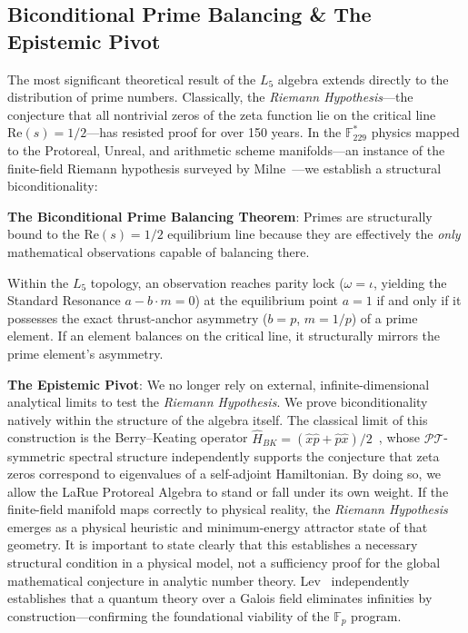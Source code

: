 \subsection{Biconditional Prime Balancing \& The Epistemic Pivot}

The most significant theoretical result of the $L_5$ algebra extends directly to the distribution of prime numbers. Classically, the \emph{Riemann Hypothesis}---the conjecture that all nontrivial zeros of the zeta function lie on the critical line $\text{Re}(s) = 1/2$---has resisted proof for over 150 years. In the $\mathbb{F}_{229}^*$ physics mapped to the Protoreal, Unreal, and arithmetic scheme manifolds---an instance of the finite-field Riemann hypothesis surveyed by Milne~\cite{Milne2015}---we establish a structural biconditionality:

\textbf{The Biconditional Prime Balancing Theorem}: Primes are structurally bound to the $\text{Re}(s) = 1/2$ equilibrium line because they are effectively the \emph{only} mathematical observations capable of balancing there. 

Within the $L_5$ topology, an observation reaches parity lock ($\omega = \iota$, yielding the Standard Resonance $a - b \cdot m = 0$) at the equilibrium point $a = 1$ if and only if it possesses the exact thrust-anchor asymmetry ($b = p$, $m = 1/p$) of a prime element. If an element balances on the critical line, it structurally mirrors the prime element's asymmetry.

\textbf{The Epistemic Pivot}: We no longer rely on external, infinite-dimensional analytical limits to test the \emph{Riemann Hypothesis}. We prove biconditionality natively within the structure of the algebra itself. The classical limit of this construction is the Berry--Keating operator $\hat{H}_{BK} = (\hat{x}\hat{p} + \hat{p}\hat{x})/2$~\cite{BenderBrodyMuller2017}, whose $\mathcal{PT}$-symmetric spectral structure independently supports the conjecture that zeta zeros correspond to eigenvalues of a self-adjoint Hamiltonian. By doing so, we allow the LaRue Protoreal Algebra to stand or fall under its own weight. If the finite-field manifold maps correctly to physical reality, the \emph{Riemann Hypothesis} emerges as a physical heuristic and minimum-energy attractor state of that geometry. It is important to state clearly that this establishes a necessary structural condition in a physical model, not a sufficiency proof for the global mathematical conjecture in analytic number theory. Lev~\cite{Lev2010} independently establishes that a quantum theory over a Galois field eliminates infinities by construction---confirming the foundational viability of the $\mathbb{F}_p$ program.

